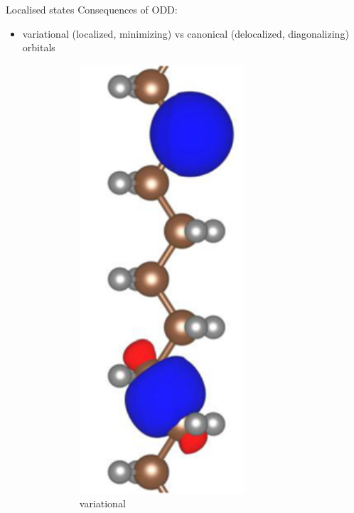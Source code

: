 \documentclass[xcolor=table,aspectratio=169]{beamer}
\numberwithin{equation}{section}
\begin{document}
\begin{frame}{Localised states}
   Consequences of ODD:
   \begin{itemize}[<+(1)->]
      \item variational (localized, minimizing) vs canonical (delocalized, diagonalizing) orbitals
            \begin{figure}[t]
               \centering
               \begin{subfigure}{0.3\textwidth}
                  \includegraphics[height=\columnwidth,angle=90]{figures/fig_nguyen_variational_orbital.png}
                  \caption{variational}
               \end{subfigure}
               \hspace{0.1\textwidth}
               \begin{subfigure}{0.3\textwidth}

\end{subfigure}
\end{figure}
\end{itemize}
\end{frame}
\end{document}
